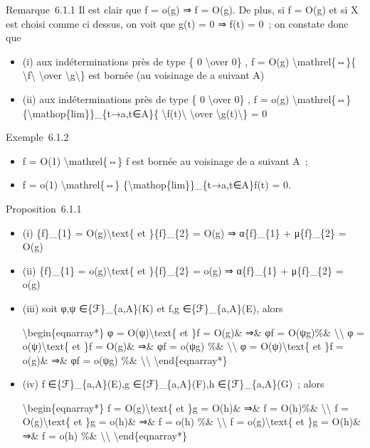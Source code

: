 \documentclass[]{article}
\begin{document}
Remarque~6.1.1 Il est clair que f = o(g) ⇒ f = O(g). De plus, si f =
O(g) et si X est choisi comme ci dessus, on voit que g(t) = 0 ⇒ f(t) =
0~; on constate donc que

\begin{itemize}
\itemsep1pt\parskip0pt
\item
  (i) aux indéterminations près de type \{ 0 \textbackslash{}over 0\} ,
  f = O(g) \textbackslash{}mathrel\{⇔\}\{
  \textbackslash{}\textbar{}f\textbackslash{}\textbar{}
  \textbackslash{}over
  \textbackslash{}\textbar{}g\textbackslash{}\textbar{}\} est bornée (au
  voisinage de a suivant A)
\item
  (ii) aux indéterminations près de type \{ 0 \textbackslash{}over 0\} ,
  f = o(g) \textbackslash{}mathrel\{⇔\}
  \{\textbackslash{}mathop\{lim\}\}\_\{t→a,t∈A\}\{
  \textbackslash{}\textbar{}f(t)\textbackslash{}\textbar{}
  \textbackslash{}over
  \textbackslash{}\textbar{}g(t)\textbackslash{}\textbar{}\} = 0
\end{itemize}

Exemple~6.1.2

\begin{itemize}
\itemsep1pt\parskip0pt
\item
  f = O(1) \textbackslash{}mathrel\{⇔\} f est bornée au voisinage de a
  suivant A~;
\item
  f = o(1) \textbackslash{}mathrel\{⇔\}
  \{\textbackslash{}mathop\{lim\}\}\_\{t→a,t∈A\}f(t) = 0.
\end{itemize}

Proposition~6.1.1

\begin{itemize}
\item
  (i) \{f\}\_\{1\} = O(g)\textbackslash{}text\{ et \}\{f\}\_\{2\} = O(g)
  ⇒ α\{f\}\_\{1\} + μ\{f\}\_\{2\} = O(g)
\item
  (ii) \{f\}\_\{1\} = o(g)\textbackslash{}text\{ et \}\{f\}\_\{2\} =
  o(g) ⇒ α\{f\}\_\{1\} + μ\{f\}\_\{2\} = o(g)
\item
  (iii) soit φ,ψ ∈\{ℱ\}\_\{a,A\}(K) et f,g ∈\{ℱ\}\_\{a,A\}(E), alors

  \textbackslash{}begin\{eqnarray*\} φ = O(ψ)\textbackslash{}text\{ et
  \}f = O(g)\& ⇒\& φf = O(ψg)\%\& \textbackslash{}\textbackslash{} φ =
  o(ψ)\textbackslash{}text\{ et \}f = O(g)\& ⇒\& φf = o(ψg) \%\&
  \textbackslash{}\textbackslash{} φ = O(ψ)\textbackslash{}text\{ et \}f
  = o(g)\& ⇒\& φf = o(ψg) \%\& \textbackslash{}\textbackslash{}
  \textbackslash{}end\{eqnarray*\}
\item
  (iv) f ∈\{ℱ\}\_\{a,A\}(E),g ∈\{ℱ\}\_\{a,A\}(F),h ∈\{ℱ\}\_\{a,A\}(G)~;
  alors

  \textbackslash{}begin\{eqnarray*\} f = O(g)\textbackslash{}text\{ et
  \}g = O(h)\& ⇒\& f = O(h)\%\& \textbackslash{}\textbackslash{} f =
  O(g)\textbackslash{}text\{ et \}g = o(h)\& ⇒\& f = o(h) \%\&
  \textbackslash{}\textbackslash{} f = o(g)\textbackslash{}text\{ et \}g
  = O(h)\& ⇒\& f = o(h) \%\& \textbackslash{}\textbackslash{}
  \textbackslash{}end\{eqnarray*\}
\end{itemize}
\end{document}
